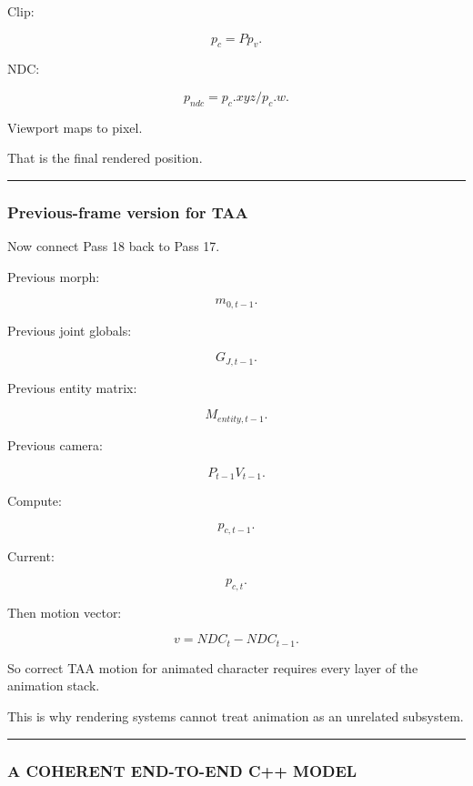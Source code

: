Clip:

\[
\boxed{
p_c=
Pp_v.
}
\]

NDC:

\[
p_{ndc}
=
p_c.xyz/p_c.w.
\]

Viewport maps to pixel.

That is the final rendered position.

\begin{center}\rule{0.5\linewidth}{0.5pt}\end{center}

\subsubsection{Previous-frame version for TAA}\label{previous-frame-version-for-taa}

Now connect Pass 18 back to Pass 17.

Previous morph:

\[
m_{0,t-1}.
\]

Previous joint globals:

\[
G_{J,t-1}.
\]

Previous entity matrix:

\[
M_{entity,t-1}.
\]

Previous camera:

\[
P_{t-1}V_{t-1}.
\]

Compute:

\[
p_{c,t-1}.
\]

Current:

\[
p_{c,t}.
\]

Then motion vector:

\[
v=
NDC_t-NDC_{t-1}.
\]

So correct TAA motion for animated character requires every layer of the animation stack.

This is why rendering systems cannot treat animation as an unrelated subsystem.

\begin{center}\rule{0.5\linewidth}{0.5pt}\end{center}

\subsubsection{A COHERENT END-TO-END C++ MODEL}\label{a-coherent-end-to-end-c-model}

